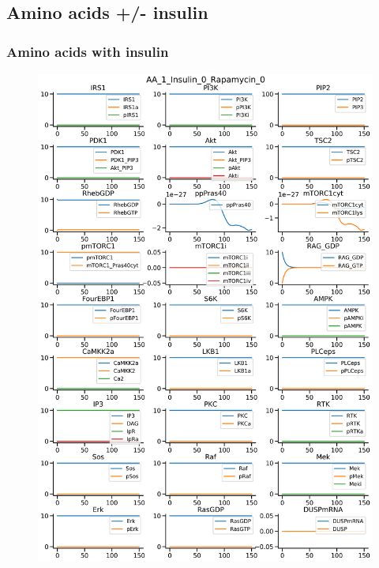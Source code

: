 \documentclass{beamer}
\begin{document}
\subsection{Amino acids +/- insulin} %
\begin{frame}
\frametitle{Amino acids with insulin}
\begin{figure}
    \begin{minipage}{0.45\textwidth}
        \centering
        \includegraphics[width=\textwidth]{../simulations/ExtendedPI3KModel/validations/AAWithInsulinWithRapamycin/AA_1_Insulin_0_Rapamycin_0-4.png}
    \end{minipage}
    \begin{minipage}{0.45\textwidth}
        \centering

\end{minipage}
\end{figure}
\end{frame}
\end{document}
